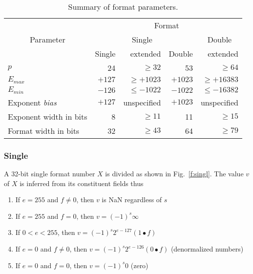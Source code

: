 \documentclass[onecolumn]{aa}
\begin{document}
\begin{table*}
\centering
\caption[Summary of format parameters.]{Summary of format parameters.}
\begin{tabular}{lrrrr} 
\hline \hline

     &\multicolumn{4}{c}{Format} \\
\multicolumn{1}{c}{Parameter} &    &\multicolumn{1}{c}{Single} &
                                   & \multicolumn{1}{c}{Double} \\
                     & Single & extended     & Double & extended     \\ 
\hline
$p$                 &     24 &    $\geq 32$ &     53  &     $\geq 64$ \\ 
$E_{max}$           & $+127$ & $\geq +1023$ & $+1023$ & $\geq +16383$ \\
$E_{min}$           & $-126$ & $\leq -1022$ & $-1022$ & $\leq -16382$ \\
Exponent {\it bias} & $+127$ &  unspecified & $+1023$ &   unspecified \\
Exponent width in bits &   8 &    $\geq 11$ &      11 &     $\geq 15$ \\
Format width in bits &    32 &    $\geq 43$ &      64 &     $\geq 79$ \\
\hline   
\end{tabular}
\label{t:FormParm}
\end{table*}


                                                      
\subsubsection{Single}

A 32-bit single format number $X$ is divided as shown in Fig.~\ref{f:singl}.
The value $v$ of $X$ is inferred from its constituent
fields thus
\begin{enumerate}
 \item If $e = 255$ and $f \neq 0$, then $v$ is NaN regardless of $s$ 
 \item If $e = 255$ and $f = 0$, then $v = (-1)^{s} \infty$
 \item If $0 < e < 255$, then $v = (-1)^{s} 2^{e-127} (1 \bullet f)$
 \item If $e = 0$ and $f \neq 0$, then $v = (-1)^{s} 2^{e-126} (0 \bullet f)$
      (denormalized numbers)
\item If $e = 0$ and $f = 0$, then $v = (-1)^{s}0$ (zero)
\end{enumerate}
\end{document}
